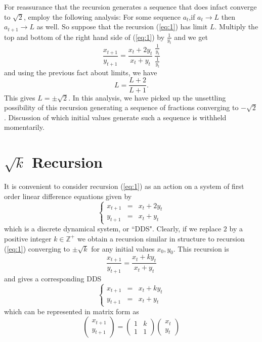 \documentclass[11pt]{article}
\theoremstyle{plain}
\theoremstyle{definition}
\begin{document}
\noindent For reassurance that the recursion generates a sequence that does infact converge to $\sqrt{2}$, employ the following analysis: For some sequence $a_t$,if $a_t\rightarrow L$ then $a_{t+1}\rightarrow L$ as well. So suppose that the recursion (\ref{eq:1}) has limit $L$.  Multiply the top and bottom of the right hand side of (\ref{eq:1}) by $\frac{1}{y_t}$ and we get $$\frac{x_{t+1}}{y_{t+1}}=\frac{x_t + 2 y_t}{x_t + y_t}\ \frac{\frac{1}{y_t}}{\frac{1}{y_t}}$$ and using the previous fact about limits, we have $$L=\frac{L+2}{L+1}.$$ This gives $L=\pm \sqrt{2}$. In this analysis, we have picked up the unsettling possibility of this recursion generating a sequence of fractions converging to $-\sqrt{2}$. Discussion of which initial values generate such a sequence is withheld momentarily.

\section{$\sqrt{k}$ Recursion}
It is convenient to consider recursion (\ref{eq:1}) as an action on a system of first order linear difference equations given by
\begin{equation}\label{eq:2}
\left\{\begin{array}{ccc}
x_{t+1} & = & x_t+2y_t \\
y_{t+1} & = & x_t + y_t\end{array}\right.
\end{equation}
which is a discrete dynamical system, or ``DDS". Clearly, if we replace $2$ by a positive integer $k\in \mathbb{Z}^+$ we obtain a recursion similar in structure to recursion (\ref{eq:1}) converging to $\pm \sqrt{k}$ for any initial values $x_0,y_0$. This recursion is
\begin{equation}\label{eq:6}
\frac{x_{t+1}}{y_{t+1}}=\frac{x_t + k y_t}{x_t + y_t}
\end{equation}
and gives a corresponding DDS
\begin{equation}\label{eq:3}
\left\{\begin{array}{ccc}
x_{t+1} & = & x_t+k y_t \\
y_{t+1} & = & x_t + y_t\end{array}\right.
\end{equation}
which can be represented in matrix form as
\begin{equation}\label{eq:4}
\left( \begin{array}{c}
x_{t+1} \\
y_{t+1} \end{array} \right)
=
\left( \begin{array}{cc}
1 & k \\
1 & 1 \end{array} \right)
\left( \begin{array}{c}
x_t \\
y_t \end{array} \right)
\end{equation}
\end{document}
